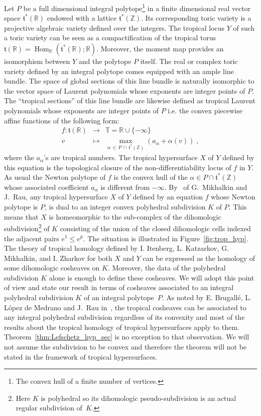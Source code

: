 \documentclass[AHL,Unicode,longabstracts,published]{cedram}
\newcommand{\R}{\mathbb{R}}
\newcommand{\Z}{\mathbb{Z}}
\newcommand{\T}{\mathbb{T}}
\renewcommand{\t}{\mathfrak{t}}
\DeclareMathOperator{\Hom}{Hom}
\begin{document}
Let $P$ be a full dimensional integral polytope\footnote{The convex hull of a finite number of vertices.} in a finite dimensional real vector space $\t^*(\R)$ endowed with a lattice $\t^*(\Z)$. Its corresponding toric variety is a projective algebraic variety defined over the integers. The tropical locus $Y$ of such a toric variety can be seen as a compactification of the tropical torus $\t(\R)=\Hom_\R(\t^*(\R);\R)$. Moreover, the moment map provides an isomorphism between $Y$ and the polytope $P$ itself. The real or complex toric variety defined by an integral polytope comes equipped with an ample line bundle. The space of global sections of this line bundle is naturally isomorphic to the vector space of Laurent polynomials whose exponents are integer points of $P$. The ``tropical sections'' of this line bundle are likewise defined as tropical Laurent polynomials whose exponents are integer points of $P$ i.e. the convex piecewise affine functions of the following form:
\begin{equation*}
\begin{array}{rcl}
f:\t(\R) & \longrightarrow & \T=\R\cup\{-\infty\}\\%
v & \longmapsto & \max\limits_{\alpha\,\in \,P\,\cap\,\t^*(\Z)}(a_\alpha + \alpha(v))\;,
\end{array}
\end{equation*}
where the $a_\alpha$'s are tropical numbers. The tropical hypersurface $X$ of $Y$ defined by this equation is the topological closure of the non-differentiability locus of $f$ in $Y$. As usual the Newton polytope of $f$ is the convex hull of the $\alpha\in P\cap\t^*(\Z)$ whose associated coefficient $a_\alpha$ is different from $-\infty$. By~\cite[Theorem~2.3.7 p.~44]{Mik-Rau_tro_geo} of G.~Mikhalkin and J.~Rau,
any tropical hypersurface $X$ of $Y$ defined by an equation $f$ whose Newton polytope is $P$, is dual to an integer convex polyhedral subdivision $K$ of $P$. This means that $X$ is homeomorphic to the sub-complex of the dihomologic subdivision\footnote{Here $K$ is polyhedral so its dihomologic pseudo-subdivision is an actual regular subdivision of~$K$.} of $K$ consisting of the union of the closed dihomologic cells indexed the adjacent pairs $e^1\leq e^p$. The situation is illustrated in Figure~\ref{fig:trop_hyp}. The theory of tropical homology defined by I. Itenberg, L. Katzarkov, G. Mikhalkin, and I. Zharkov for both $X$ and $Y$ can be expressed as the homology of some dihomologic cosheaves on $K$. Moreover, the data of the polyhedral subdivision $K$ alone is enough to define these cosheaves. We will adopt this point of view and state our result in terms of cosheaves associated to an integral polyhedral subdivision $K$ of an integral polytope~$P$. As noted by E. Brugallé, L. L\'opez de Medrano and J.~Rau in~\cite{Brug-LdM-Rau_Comb_pac}, the tropical cosheaves can be associated to any integral polyhedral subdivision regardless of its convexity and most of the results about the tropical homology of tropical hypersurfaces apply to them. Theorem~\ref{thm:Lefschetz_hyp_sec} is no exception to that observation. We will not assume the subdivision to be convex and therefore the theorem will not be stated in the framework of tropical hypersurfaces.
\end{document}
